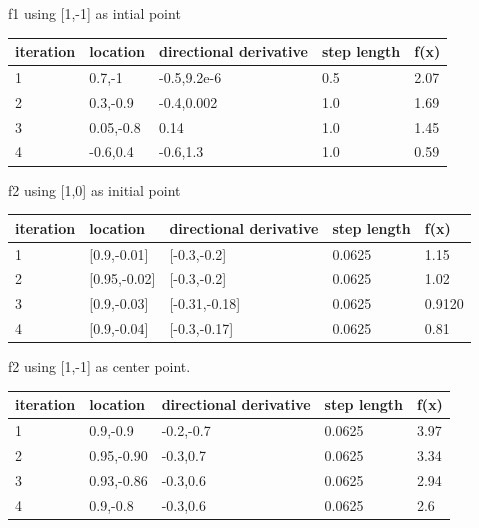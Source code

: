 \documentclass[7pt]{article}
\begin{document}
		
		
		f1 using [1,-1] as intial point  
			\begin{center}
				\begin{tabular}{ | l | l | l | l | l |}
					\hline
					iteration & location & directional derivative & step length & f(x) \\ \hline
					1& 0.7,-1 & -0.5,9.2e-6  & 0.5 & 2.07\\ \hline
					2& 0.3,-0.9 & -0.4,0.002  & 1.0 & 1.69\\ \hline
					3& 0.05,-0.8 & 0.14 & 1.0 & 1.45\\ \hline
					4& -0.6,0.4 & -0.6,1.3  & 1.0  & 0.59\\
					\hline
				\end{tabular}
			\end{center}
			
	
	f2 using [1,0] as initial point 
		\begin{center}
			\begin{tabular}{ | l | l | l | l | l |}
				\hline
				iteration & location & directional derivative & step length & f(x) \\ \hline
				1& [0.9,-0.01] & [-0.3,-0.2]  & 0.0625 & 1.15\\ \hline
				2& [0.95,-0.02] & [-0.3,-0.2] & 0.0625 & 1.02\\ \hline
				3& [0.9,-0.03] & [-0.31,-0.18] & 0.0625 & 0.9120\\ \hline
				4& [0.9,-0.04] & [-0.3,-0.17] & 0.0625 & 0.81\\
				\hline
			\end{tabular}
		\end{center}
		
		f2 using [1,-1] as center point. 
				\begin{center}
					\begin{tabular}{ | l | l | l | l | l |}
						\hline
						iteration & location & directional derivative & step length & f(x) \\ \hline
						1& 0.9,-0.9 & -0.2,-0.7 & 0.0625 & 3.97\\ \hline
						2& 0.95,-0.90 & -0.3,0.7  & 0.0625 & 3.34\\ \hline
						3& 0.93,-0.86 & -0.3,0.6  & 0.0625 & 2.94\\ \hline
						4& 0.9,-0.8 & -0.3,0.6  & 0.0625 & 2.6\\
						\hline
					\end{tabular}
				\end{center}
\end{document}
